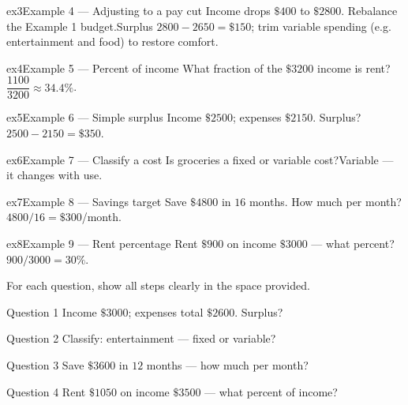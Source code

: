 \documentclass[11pt]{article}
\begin{document}
\begin{example}{ex3}{Example 4 --- Adjusting to a pay cut}
Income drops $\$400$ to $\$2800$. Rebalance the Example 1 budget.\soln Surplus $2800-2650=\$150$; trim variable spending (e.g. entertainment and food) to restore comfort.
\end{example}

\begin{example}{ex4}{Example 5 --- Percent of income}
What fraction of the $\$3200$ income is rent?\soln $\dfrac{1100}{3200}\approx34.4\%$.
\end{example}

\begin{example}{ex5}{Example 6 --- Simple surplus}
Income $\$2500$; expenses $\$2150$. Surplus?\soln $2500-2150=\$350$.
\end{example}

\begin{example}{ex6}{Example 7 --- Classify a cost}
Is groceries a fixed or variable cost?\soln Variable — it changes with use.
\end{example}

\begin{example}{ex7}{Example 8 --- Savings target}
Save $\$4800$ in $16$ months. How much per month?\soln $4800/16=\$300$/month.
\end{example}

\begin{example}{ex8}{Example 9 --- Rent percentage}
Rent $\$900$ on income $\$3000$ — what percent?\soln $900/3000=30\%$.
\end{example}

\clearpage
{}
For each question, show all steps clearly in the space provided.

\begin{qbox}{Question 1}
Income $\$3000$; expenses total $\$2600$. Surplus?\workspace{2.4cm}
\end{qbox}

\begin{qbox}{Question 2}
Classify: entertainment — fixed or variable?\workspace{2.4cm}
\end{qbox}

\begin{qbox}{Question 3}
Save $\$3600$ in $12$ months — how much per month?\workspace{2.4cm}
\end{qbox}

\begin{qbox}{Question 4}
Rent $\$1050$ on income $\$3500$ — what percent of income?\workspace{2.4cm}
\end{qbox}
\end{document}
